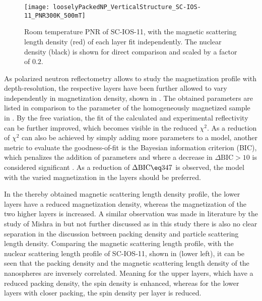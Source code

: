 \documentclass[\main/dresen_thesis.tex]{subfiles}
\begin{document}
  \begin{figure}[tb]
    \centering
    \texttt{[image: looselyPackedNP\_VerticalStructure\_SC-IOS-11\_PNR300K\_500mT]}
    \caption{\label{fig:looselyPackedNP:layer:pnrRoomTemperatureMagnetic}Room temperature PNR of SC-IOS-11, with the magnetic scattering length density (red) of each layer fit independently. The nuclear density (black) is shown for direct comparison and scaled by a factor of $0.2$.}
  \end{figure}
  As polarized neutron reflectometry allows to study the magnetization profile with depth-resolution, the respective layers have been further allowed to vary independently in magnetization density, shown in .
  The obtained parameters are listed in comparison to the parameter of the homogeneously magnetized sample in .
  By the free variation, the fit of the calculated and experimental reflectivity can be further improved, which becomes visible in the reduced $\chi^2$.
  As a reduction of $\chi^2$ can also be achieved by simply adding more parameters to a model, another metric to evaluate the goodness-of-fit is the Bayesian information criterion (BIC), which penalizes the addition of parameters and where a decrease in $\Delta \mathrm{BIC} > 10$ is considered significant \cite{Schwarz_1978_Estim, Kass_1995_Bayes}.
  As a reduction of $\Delta \mathrm{BIC} \eq 347$ is observed, the model with the varied magnetization in the layers should be preferred.

  In the thereby obtained magnetic scattering length density profile, the lower layers have a reduced magnetization density, whereas the magnetization of the two higher layers is increased.
  A similar observation was made in literature by the study of Mishra \etal in \cite{Mishra_2012_Selfa} but not further discussed as in this study there is also no clear separation in the discussion between packing density and particle scattering length density.
  Comparing the magnetic scattering length profile, with the nuclear scattering length profile of SC-IOS-11, shown in  (lower left), it can be seen that the packing density and the magnetic scattering length density of the nanospheres are inversely correlated.
  Meaning for the upper layers, which have a reduced packing density, the spin density is enhanced, whereas for the lower layers with closer packing, the spin density per layer is reduced.
\end{document}
